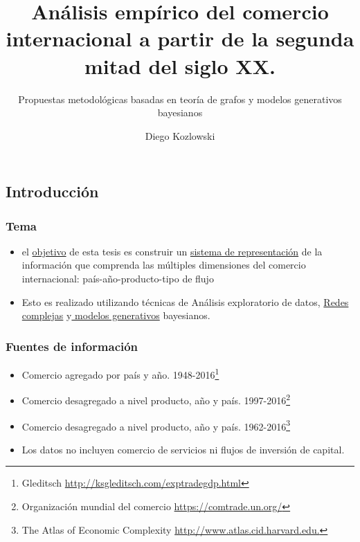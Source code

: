\documentclass[compress]{beamer}
\title[Defensa de Tesis]{Análisis empírico del comercio internacional a partir de la segunda mitad del siglo XX.}
\subtitle{Propuestas metodológicas basadas en teoría de grafos y modelos generativos
	bayesianos}
\author{Diego Kozlowski}
\institute[Universidad de Buenos Aires]
{
	Universidad de Buenos Aires\\ 
	
	\textit{Master en Data Mining \& Knowledge Discovery} \\
	\medskip
	\textit{Supervisor: Viktoriya Semeshenko}
}
\date{}
\begin{document}
	
	\begin{frame}
	
	\titlepage 
	
\end{frame}



\begin{frame}

\section{Introducción}


\frametitle{Tema}

\begin{itemize}
	
	\item[\faRebel] el \underline{objetivo} de esta tesis es construir un \underline{sistema de representación} de la información que comprenda las múltiples dimensiones del comercio internacional: país-año-producto-tipo de flujo
	\item[\faRebel] Esto es realizado utilizando técnicas de Análisis exploratorio de datos, \underline{Redes complejas} y\underline{ modelos generativos} bayesianos. 
\end{itemize}

\end{frame}


\begin{frame}
\frametitle{Fuentes de información}

\begin{itemize}

\item[\faRebel] Comercio agregado por país y año. 1948-2016\footnote{Gleditsch \url{http://ksgleditsch.com/exptradegdp.html}}  
\item[\faRebel] Comercio desagregado a nivel producto, año y país. 1997-2016\footnote{Organización mundial del comercio \url{https://comtrade.un.org/}}
\item[\faRebel] Comercio desagregado a nivel producto, año y país. 1962-2016\footnote{The Atlas of Economic Complexity \url{http://www.atlas.cid.harvard.edu.}}	

\item[\faRebel] Los datos no incluyen comercio de servicios ni flujos de inversión de capital.
\end{itemize}

\end{frame}
\end{document}
